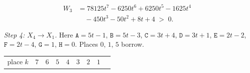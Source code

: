 \documentclass[11pt,letterpaper]{article}
\theoremstyle{paperstyle}
\theoremstyle{paperstyledef}
\theoremstyle{paperstylerem}
\begin{document}
\[\begin{aligned}
W_3 &= 78125t^7 - 6250t^6 + 6250t^5 - 1625t^4\\
&\quad - 450t^3 - 50t^2 + 8t + 4 \;>\; 0.
\end{aligned}\]

\emph{Step 4: \(X_4 \to X_1\).} Here \(\mathtt{A} = 5t-1\), \(\mathtt{B} = 5t-3\), \(\mathtt{C} = 3t+4\), \(\mathtt{D} = 3t+1\), \(\mathtt{E} = 2t-2\), \(\mathtt{F} = 2t-4\), \(\mathtt{G} = 1\), \(\mathtt{H} = 0\). Places \(0\), \(1\), \(5\) borrow.

{\def\LTcaptype{none} %
\begin{longtable}[]{@{}
  >{\raggedright\arraybackslash}p{}
  >{\raggedright\arraybackslash}p{}
  >{\raggedright\arraybackslash}p{}
  >{\raggedright\arraybackslash}p{}
  >{\raggedright\arraybackslash}p{}
  >{\raggedright\arraybackslash}p{}
  >{\raggedright\arraybackslash}p{}
  >{\raggedright\arraybackslash}p{}
  >{\raggedright\arraybackslash}p{}@{}}
\toprule\noalign{}
\begin{minipage}[b]{\linewidth}\raggedright
place \(k\)
\end{minipage} & \begin{minipage}[b]{\linewidth}\raggedright
\(7\)
\end{minipage} & \begin{minipage}[b]{\linewidth}\raggedright
\(6\)
\end{minipage} & \begin{minipage}[b]{\linewidth}\raggedright
\(5\)
\end{minipage} & \begin{minipage}[b]{\linewidth}\raggedright
\(4\)
\end{minipage} & \begin{minipage}[b]{\linewidth}\raggedright
\(3\)
\end{minipage} & \begin{minipage}[b]{\linewidth}\raggedright
\(2\)
\end{minipage} & \begin{minipage}[b]{\linewidth}\raggedright
\(1\)
\end{minipage} & \begin{minipage}[b]{\linewidth}\raggedright

\end{minipage}
\end{longtable}}
\end{document}
